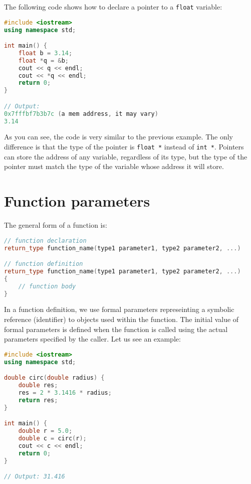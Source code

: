 The following code shows how to declare a pointer to a \texttt{float} variable:

\begin{lstlisting}[language=C++]
#include <iostream>
using namespace std;

int main() {
    float b = 3.14;
    float *q = &b;
    cout << q << endl;
    cout << *q << endl;
    return 0;
}

// Output:
0x7fffbf7b3b7c (a mem address, it may vary)
3.14
\end{lstlisting}

As you can see, the code is very similar to the previous example. The only
difference is that the type of the pointer is \texttt{float *} instead of
\texttt{int *}. Pointers can store the address of any variable, regardless of its
type, but the type of the pointer must match the type of the variable whose
address it will store.

\section{Function parameters}

The general form of a function is:

\begin{lstlisting}[language=C++]
// function declaration
return_type function_name(type1 parameter1, type2 parameter2, ...)

// function definition
return_type function_name(type1 parameter1, type2 parameter2, ...)
{
    // function body
}
\end{lstlisting}

In a function definition, we use formal parameters represeinting a symbolic
reference (identifier) to objects used within the function. The initial value of
formal parameters is defined when the function is called using the actual 
parameters specified by the caller. Let us see an example:\\

\begin{lstlisting}[language=C++]
#include <iostream>
using namespace std;

double circ(double radius) {
    double res;
    res = 2 * 3.1416 * radius;
    return res;
}

int main() {
    double r = 5.0;
    double c = circ(r);
    cout << c << endl;
    return 0;
}

// Output: 31.416
\end{lstlisting}

